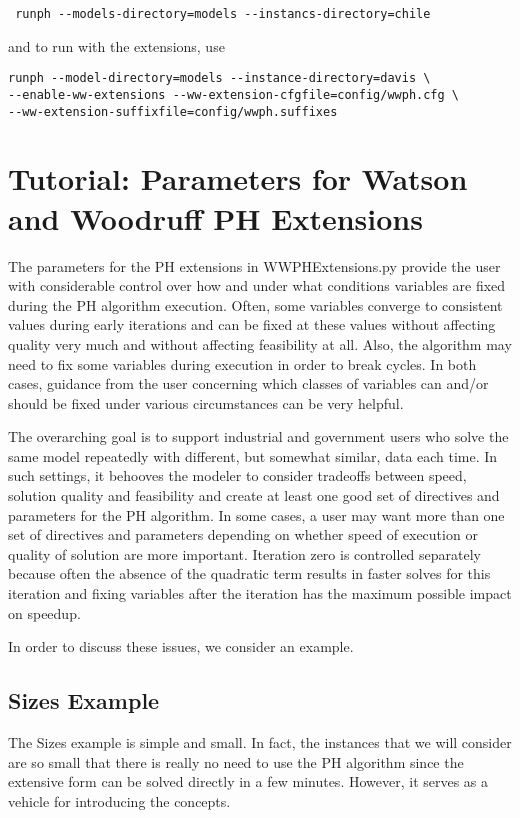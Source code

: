 \begin{verbatim}
 runph --models-directory=models --instancs-directory=chile
\end{verbatim}
and to run with the extensions, use
\begin{verbatim}
runph --model-directory=models --instance-directory=davis \
--enable-ww-extensions --ww-extension-cfgfile=config/wwph.cfg \
--ww-extension-suffixfile=config/wwph.suffixes
\end{verbatim}


\section{Tutorial: Parameters for Watson and Woodruff PH Extensions \label{WWTutorialSec}}

The parameters for the PH extensions in WWPHExtensions.py provide the user with considerable control over
how and under what conditions variables are fixed during the PH algorithm execution. Often, some variables converge
to consistent values during early iterations and can be fixed at these values without affecting quality very much and without
affecting feasibility at all. Also, the algorithm may need to fix some variables during execution in order to break cycles.
In both cases, guidance from the user concerning which classes of variables can and/or should be fixed under various circumstances can be very helpful.

The overarching goal is to support industrial and government users who solve the same model repeatedly with different, but
somewhat similar, data each time. In such settings, it behooves the modeler to consider tradeoffs between speed, solution quality
and feasibility and create at least one good set of directives and parameters for the PH algorithm. In some cases, a user may want more than
one set of directives and parameters depending on whether speed of execution or quality of solution are more important. Iteration zero is controlled separately because often the absence of the quadratic term results in faster solves for this
iteration and fixing variables after the iteration has the maximum possible impact on speedup.

In order to discuss these issues, we consider an example.

\subsection{Sizes Example}

The Sizes example is simple and small. In fact, the instances that we will consider are so small that there is really
no need to use the PH algorithm since the extensive form can be solved directly in a few minutes. However, it serves as a 
vehicle for introducing the concepts.


